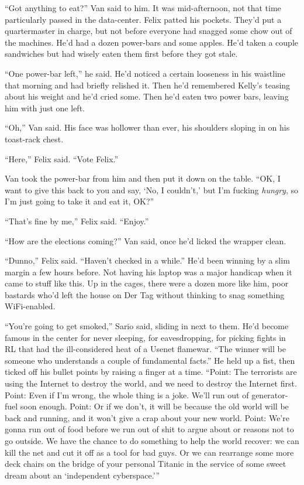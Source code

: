 \tb

“Got anything to eat?” Van said to him. It was mid-afternoon, not
that time particularly passed in the data-center. Felix patted his
pockets. They’d put a quartermaster in charge, but not before
everyone had snagged some chow out of the machines. He’d had a
dozen power-bars and some apples. He’d taken a couple sandwiches
but had wisely eaten them first before they got stale.

“One power-bar left,” he said. He’d noticed a certain looseness in
his waistline that morning and had briefly relished it. Then he’d
remembered Kelly’s teasing about his weight and he’d cried some.
Then he’d eaten two power bars, leaving him with just one left.

“Oh,” Van said. His face was hollower than ever, his shoulders
sloping in on his toast-rack chest.

“Here,” Felix said. “Vote Felix.”

Van took the power-bar from him and then put it down on the table.
“OK, I want to give this back to you and say, ‘No, I couldn’t,’ but
I’m fucking \emph{hungry}, so I’m just going to take it and eat it,
OK?”

“That’s fine by me,” Felix said. “Enjoy.”

“How are the elections coming?” Van said, once he’d licked the
wrapper clean.

“Dunno,” Felix said. “Haven’t checked in a while.” He’d been
winning by a slim margin a few hours before. Not having his laptop
was a major handicap when it came to stuff like this. Up in the
cages, there were a dozen more like him, poor bastards who’d left
the house on Der Tag without thinking to snag something
WiFi-enabled.

“You’re going to get smoked,” Sario said, sliding in next to them.
He’d become famous in the center for never sleeping, for
eavesdropping, for picking fights in RL that had the ill-considered
heat of a Usenet flamewar. “The winner will be someone who
understands a couple of fundamental facts.” He held up a fist, then
ticked off his bullet points by raising a finger at a time. “Point:
The terrorists are using the Internet to destroy the world, and we
need to destroy the Internet first. Point: Even if I’m wrong, the
whole thing is a joke. We’ll run out of generator-fuel soon enough.
Point: Or if we don’t, it will be because the old world will be
back and running, and it won’t give a crap about your new world.
Point: We’re gonna run out of food before we run out of shit to
argue about or reasons not to go outside. We have the chance to do
something to help the world recover: we can kill the net and cut it
off as a tool for bad guys. Or we can rearrange some more deck
chairs on the bridge of your personal Titanic in the service of
some sweet dream about an ‘independent cyberspace.’”

